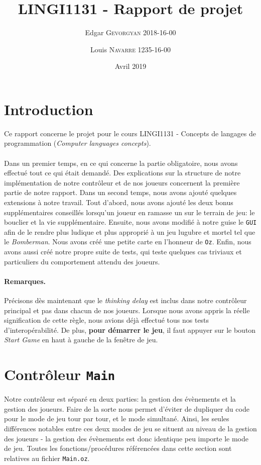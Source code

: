 \documentclass{article}
\title{LINGI1131 - Rapport de projet}
\author{Edgar \textsc{Gevorgyan} 2018-16-00 \and Louis \textsc{Navarre} 1235-16-00}
\date{Avril 2019}
\begin{document}
\maketitle
{}
\tableofcontents
{}
\newpage
\section{Introduction}
Ce rapport concerne le projet pour le cours LINGI1131 - Concepts de langages de programmation (\emph{Computer languages concepts}). \\ \\
Dans un premier temps, en ce qui concerne la partie obligatoire, nous avons effectué tout ce qui était demandé. Des explications sur la structure de notre implémentation de notre contrôleur et de nos joueurs concernent la première partie de notre rapport. Dans un second temps, nous avons ajouté quelques extensions à notre travail. Tout d'abord, nous avons ajouté les deux bonus supplémentaires conseillés lorsqu'un joueur en ramasse un sur le terrain de jeu: le bouclier et la vie supplémentaire. Ensuite, nous avons modifié à notre guise le \texttt{GUI} afin de le rendre plus ludique et plus approprié à un jeu lugubre et mortel tel que le \emph{Bomberman}. Nous avons créé une petite carte en l'honneur de \texttt{Oz}. Enfin, nous avons aussi créé notre propre suite de tests, qui teste quelques cas triviaux et particuliers du comportement attendu des joueurs.
\paragraph{Remarques.}Précisons dès maintenant que le \emph{thinking delay} est inclus dans notre contrôleur principal et pas dans chacun de nos joueurs. Lorsque nous avons appris la réelle signification de cette règle, nous avions déjà effectué tous nos tests d'interopérabilité. De plus, \textbf{pour démarrer le jeu}, il faut appuyer sur le bouton \emph{Start Game} en haut à gauche de la fenêtre de jeu.

\section{Contrôleur \texttt{Main}}
Notre contrôleur est séparé en deux parties: la gestion des évènements et la gestion des joueurs. Faire de la sorte nous permet d'éviter de dupliquer du code pour le mode de jeu tour par tour, et le mode simultané. Ainsi, les seules différences notables entre ces deux modes de jeu se situent au niveau de la gestion des joueurs - la gestion des évènements est donc identique peu importe le mode de jeu. Toutes les fonctions/procédures référencées dans cette section sont relatives au fichier \texttt{Main.oz}.
\end{document}

